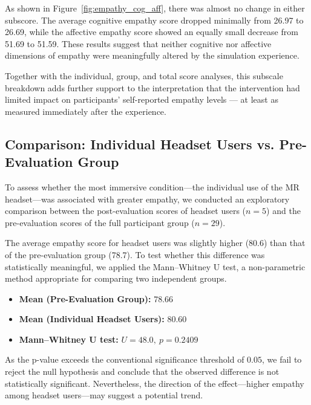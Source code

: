 As shown in Figure~\ref{fig:empathy_cog_aff}, there was almost no change in either subscore. The average cognitive empathy score dropped minimally from 26.97 to 26.69, while the affective empathy score showed an equally small decrease from 51.69 to 51.59. These results suggest that neither cognitive nor affective dimensions of empathy were meaningfully altered by the simulation experience.

Together with the individual, group, and total score analyses, this subscale breakdown adds further support to the interpretation that the intervention had limited impact on participants' self-reported empathy levels — at least as measured immediately after the experience.

\subsection{Comparison: Individual Headset Users vs. Pre-Evaluation Group}

To assess whether the most immersive condition—the individual use of the MR headset—was associated with greater empathy, we conducted an exploratory comparison between the post-evaluation scores of headset users ($n=5$) and the pre-evaluation scores of the full participant group ($n=29$).

The average empathy score for headset users was slightly higher (80.6) than that of the pre-evaluation group (78.7). To test whether this difference was statistically meaningful, we applied the Mann–Whitney U test, a non-parametric method appropriate for comparing two independent groups.

\begin{itemize}
  \item \textbf{Mean (Pre-Evaluation Group):} 78.66
  \item \textbf{Mean (Individual Headset Users):} 80.60
  \item \textbf{Mann–Whitney U test:} $U = 48.0,\ p = 0.2409$
\end{itemize}

As the p-value exceeds the conventional significance threshold of $0.05$, we fail to reject the null hypothesis and conclude that the observed difference is not statistically significant. Nevertheless, the direction of the effect—higher empathy among headset users—may suggest a potential trend.

